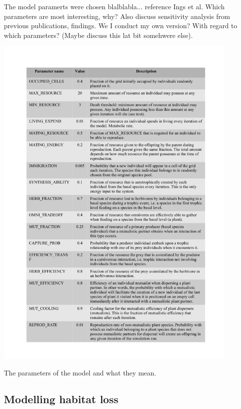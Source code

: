 The model paramerts were chosen blalblabla... reference Ings et al. Which parameters are most interesting, why? Also discuss sensitivity analysis from previous publications, findings. We I conduct my own version? With regard to which parameters? (Maybe discuss this lat bit somehwere else).

\begin{table}[hp!]
\centering
\includegraphics[width=0.9\textwidth]{"tables/IBM_parameters"}
\caption{The parameters of the model and what they mean.}
\label{tab:IBM_parameters}
\end{table}

\subsection{Modelling habitat loss}
\label{sec:model_HL}


